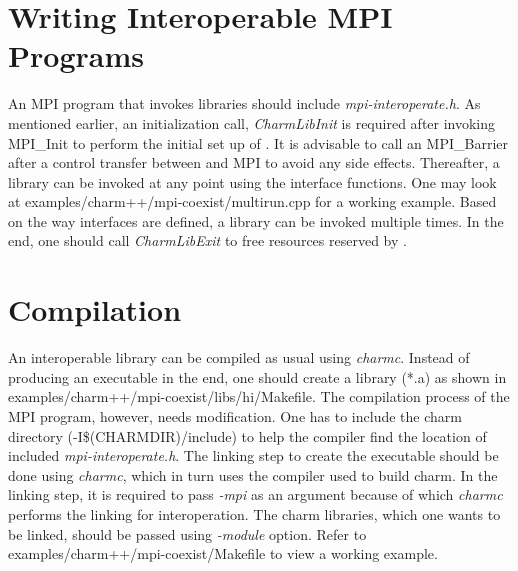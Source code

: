 \section{Writing Interoperable MPI Programs}
An MPI program that invokes \charmpp{} libraries should include {\em mpi-interoperate.h}. 
As mentioned earlier, an initialization call, {\em CharmLibInit} is 
required after invoking MPI\_Init to perform the initial set up of \charmpp{}. 
It is advisable to call an MPI\_Barrier after a control transfer between \charmpp{} 
and MPI to avoid any side effects. Thereafter, a \charmpp{} library can be invoked at
any point using the interface functions. One may look at
examples/charm++/mpi-coexist/multirun.cpp for a working example. Based on the
way interfaces are defined, a library can be invoked multiple times. In the end,
one should call {\em CharmLibExit} to free resources reserved by \charmpp{}.

\section{Compilation}
An interoperable \charmpp{} library can be compiled as usual using {\em charmc}.
Instead of producing an executable in the end, one should create a library (*.a)
as shown in examples/charm++/mpi-coexist/libs/hi/Makefile. The compilation
process of the MPI program, however, needs modification. One has to include the
charm directory (-I\$(CHARMDIR)/include) to help the compiler find the location of
included {\em mpi-interoperate.h}. The linking step to create the executable
should be done using {\em charmc}, which in turn uses the compiler used to build
charm. In the linking step, it is required to pass {\em -mpi} as an argument
because of which {\em charmc} performs the linking for interoperation. The charm
libraries, which one wants to be linked, should be passed using {\em -module}
option. Refer to examples/charm++/mpi-coexist/Makefile to view a working
example.


